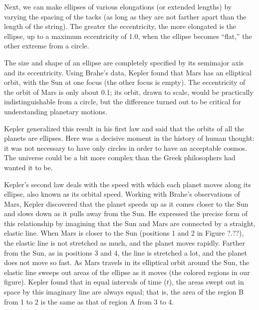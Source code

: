 \documentclass[../../main-astronomy.tex]{subfiles}
\begin{document}
Next, we can make ellipses of various elongations (or extended lengths) by varying the spacing of the tacks (as long as they are not farther apart than the length of the string). The greater the eccentricity, the more elongated is the ellipse, up to a maximum eccentricity of 1.0, when the ellipse becomes ``flat,'' the other extreme from a circle.

\vspace{1em}

The size and shape of an ellipse are completely specified by its semimajor axis and its eccentricity. Using Brahe's data, Kepler found that Mars has an elliptical orbit, with the Sun at one focus (the other focus is empty). The eccentricity of the orbit of Mars is only about 0.1; its orbit, drawn to scale, would be practically indistinguishable from a circle, but the difference turned out to be critical for understanding planetary motions.

\vspace{1em}

Kepler generalized this result in his first law and said that the orbits of all the planets are ellipses. Here was a decisive moment in the history of human thought: it was not necessary to have only circles in order to have an acceptable cosmos. The universe could be a bit more complex than the Greek philosophers had wanted it to be.

\vspace{1em}

Kepler's second law deals with the speed with which each planet moves along its ellipse, also known as its \gls{orbital speed}. Working with Brahe's observations of Mars, Kepler discovered that the planet speeds up as it comes closer to the Sun and slows down as it pulls away from the Sun. He expressed the precise form of this relationship by imagining that the Sun and Mars are connected by a straight, elastic line. When Mars is closer to the Sun (positions 1 and 2 in Figure ?.??), the elastic line is not stretched as much, and the planet moves rapidly. Farther from the Sun, as in positions 3 and 4, the line is stretched a lot, and the planet does not move so fast. As Mars travels in its elliptical orbit around the Sun, the elastic line sweeps out areas of the ellipse as it moves (the colored regions in our figure). Kepler found that in equal intervals of time ($t$), the areas swept out in space by this imaginary line are always equal; that is, the area of the region B from 1 to 2 is the same as that of region A from 3 to 4.
\end{document}
